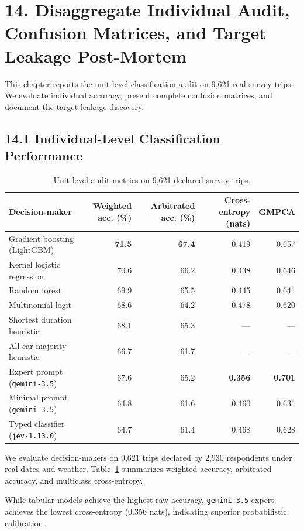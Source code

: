 \section{14. Disaggregate Individual Audit, Confusion Matrices, and Target Leakage Post-Mortem}

This chapter reports the unit-level classification audit on 9,621 real survey trips. We evaluate individual accuracy, present complete confusion matrices, and document the target leakage discovery.

\subsection{14.1 Individual-Level Classification Performance}

\begin{table}[t]
\centering
\caption{Unit-level audit metrics on 9,621 declared survey trips.}
\label{tab-audit_metrics}
\small
\begin{tabular}{lrrrr}
\toprule
\textbf{Decision-maker} & \textbf{Weighted acc. (\%)} & \textbf{Arbitrated acc. (\%)} & \textbf{Cross-entropy (nats)} & \textbf{GMPCA} \\
\midrule
Gradient boosting (LightGBM) & \textbf{71.5} & \textbf{67.4} & 0.419 & 0.657 \\
Kernel logistic regression & 70.6 & 66.2 & 0.438 & 0.646 \\
Random forest & 69.9 & 65.5 & 0.445 & 0.641 \\
Multinomial logit & 68.6 & 64.2 & 0.478 & 0.620 \\
Shortest duration heuristic & 68.1 & 65.3 & --- & --- \\
All-car majority heuristic & 66.7 & 61.7 & --- & --- \\
Expert prompt (\texttt{gemini-3.5}) & 67.6 & 65.2 & \textbf{0.356} & \textbf{0.701} \\
Minimal prompt (\texttt{gemini-3.5}) & 64.8 & 61.6 & 0.460 & 0.631 \\
Typed classifier (\texttt{jev-1.13.0}) & 64.7 & 61.4 & 0.468 & 0.628 \\
\bottomrule
\end{tabular}
\end{table}

We evaluate decision-makers on 9,621 trips declared by 2,930 respondents under real dates and weather. Table~\ref{tab-audit_metrics} summarizes weighted accuracy, arbitrated accuracy, and multiclass cross-entropy.

While tabular models achieve the highest raw accuracy, \texttt{gemini-3.5} expert achieves the lowest cross-entropy (0.356 nats), indicating superior probabilistic calibration.

